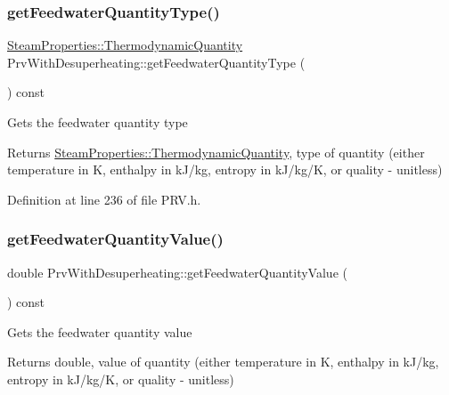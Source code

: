 \subsubsection{\texorpdfstring{get\+Feedwater\+Quantity\+Type()}{getFeedwaterQuantityType()}\hspace{0.1cm}{\footnotesize\ttfamily [3/3]}}
{\footnotesize\ttfamily \hyperlink{class_steam_properties_ae0294bedf7d178c2d8fb6aed0f62fbff}{Steam\+Properties\+::\+Thermodynamic\+Quantity} Prv\+With\+Desuperheating\+::get\+Feedwater\+Quantity\+Type (\begin{DoxyParamCaption}{ }\end{DoxyParamCaption}) const\hspace{0.3cm}{\ttfamily [inline]}}

Gets the feedwater quantity type

\begin{DoxyReturn}{Returns}
\hyperlink{class_steam_properties_ae0294bedf7d178c2d8fb6aed0f62fbff}{Steam\+Properties\+::\+Thermodynamic\+Quantity}, type of quantity (either temperature in K, enthalpy in k\+J/kg, entropy in k\+J/kg/K, or quality -\/ unitless) 
\end{DoxyReturn}


Definition at line 236 of file P\+R\+V.\+h.

\mbox{\label{class_prv_with_desuperheating_a8645a251b2e77e434a8bc51dfedcad69}} 
\subsubsection{\texorpdfstring{get\+Feedwater\+Quantity\+Value()}{getFeedwaterQuantityValue()}\hspace{0.1cm}{\footnotesize\ttfamily [1/3]}}
{\footnotesize\ttfamily double Prv\+With\+Desuperheating\+::get\+Feedwater\+Quantity\+Value (\begin{DoxyParamCaption}{ }\end{DoxyParamCaption}) const\hspace{0.3cm}{\ttfamily [inline]}}

Gets the feedwater quantity value

\begin{DoxyReturn}{Returns}
double, value of quantity (either temperature in K, enthalpy in k\+J/kg, entropy in k\+J/kg/K, or quality -\/ unitless) 
\end{DoxyReturn}


